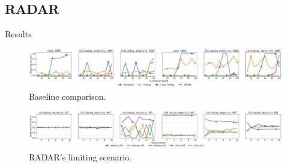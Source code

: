 \subsection*{RADAR}

\begin{frame}
  \subsectionpage
\end{frame}

\begin{frame}{Results}
  \begin{figure}
    \centering
    \includegraphics[width=.9\textwidth]{figures/radar/baselines.png}
    \caption{Baseline comparison.}
  \end{figure}
  \begin{figure}
    \centering
    \includegraphics[width=.9\textwidth]{figures/radar/limiting-case.png}
    \caption{RADAR's limiting scenario.}
  \end{figure}
\end{frame}
